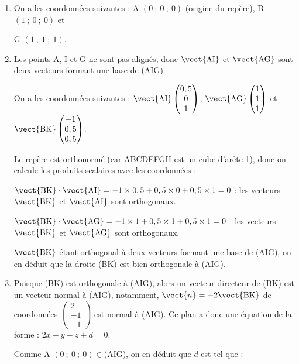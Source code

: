 \begin{enumerate}
\item On a les coordonnées suivantes : A $(0~;~0~;~0)$ (origine du repère), B $(1~;~0~;~0)$ et 

G $(1~;~1~;~1)$.

\item Les points A, I et G ne sont pas alignés, donc $ \vect{\mathrm{AI}} $ et $ \vect{\mathrm{AG}} $ sont deux vecteurs formant une base de (AIG).

On a les coordonnées suivantes : $ \vect{\mathrm{AI}} \begin{pmatrix} 0,5\\0\\1 \end{pmatrix} $, $ \vect{\mathrm{AG}} \begin{pmatrix} 1\\1\\1 \end{pmatrix} $ et $ \vect{\mathrm{BK}} \begin{pmatrix} -1\\0,5\\0,5 \end{pmatrix} $.

Le repère est orthonormé (car ABCDEFGH est un cube d'arête 1), donc on calcule les produits scalaires avec les coordonnées :

$ \vect{\mathrm{BK}}\cdot\vect{\mathrm{AI}} = -1 \times 0,5 + 0,5 \times 0 + 0,5 \times 1 = 0$ : les vecteurs $ \vect{\mathrm{BK}}$ et $\vect{\mathrm{AI}}$ sont orthogonaux.

$ \vect{\mathrm{BK}}\cdot\vect{\mathrm{AG}} = -1 \times 1 + 0,5 \times 1 + 0,5 \times 1 = 0$ : les vecteurs $ \vect{\mathrm{BK}}$ et $\vect{\mathrm{AG}}$ sont orthogonaux.

$ \vect{\mathrm{BK}}$ étant orthogonal à deux vecteurs formant une base de (AIG), on en déduit que la droite (BK) est bien orthogonale à (AIG).

\item Puisque (BK) est orthogonale à (AIG), alors un vecteur directeur de (BK) est un vecteur normal à (AIG), notamment, $\vect{n} = -2\vect{\mathrm{BK}}$ de coordonnées $\begin{pmatrix} 2\\-1\\-1 \end{pmatrix} $ est normal à (AIG). Ce plan a donc une équation de la forme :
\quad
$2x - y - z + d=0$.

Comme A $ (0~;~0~;~0) \in $(AIG), on en déduit que $d$ est tel que :


\end{enumerate}
